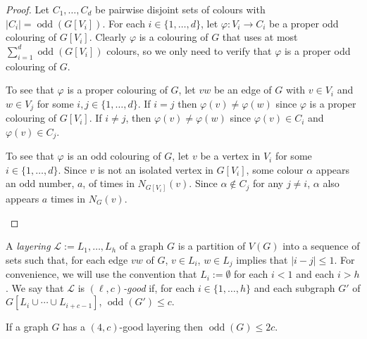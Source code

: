 \documentclass{patmorin}
\DeclareMathOperator{\odd}{odd}
\begin{document}
\begin{proof}
  Let $C_1,\ldots,C_d$ be pairwise disjoint sets of colours with $|C_i|=\odd(G[V_i])$.  For each $i\in\{1,\ldots,d\}$, let $\varphi:V_i\to C_i$ be a proper odd colouring of $G[V_i]$.  Clearly $\varphi$ is a colouring of $G$ that uses at most $\sum_{i=1}^d \odd(G[V_i])$ colours, so we only need to verify that $\varphi$ is a proper odd colouring of $G$.
  \begin{compactitem}
    \item To see that $\varphi$ is a proper colouring of $G$, let $vw$ be an edge of $G$ with $v\in V_i$ and $w\in V_j$ for some $i,j\in\{1,\ldots,d\}$. If $i=j$ then $\varphi(v)\neq\varphi(w)$ since $\varphi$ is a proper colouring of $G[V_i]$.  If $i\neq j$, then $\varphi(v)\neq\varphi(w)$ since $\varphi(v)\in C_i$ and $\varphi(v)\in C_j$.

    \item To see that $\varphi$ is an odd colouring of $G$, let $v$ be a vertex in $V_i$ for some $i\in\{1,\ldots,d\}$.   Since $v$ is not an isolated vertex in $G[V_i]$, some colour $\alpha$ appears an odd number, $a$, of times in $N_{G[V_i]}(v)$.  Since $\alpha\not\in C_j$ for any $j\neq i$, $\alpha$ also appears $a$ times in $N_G(v)$. \qedhere
  \end{compactitem}
\end{proof}


A \emph{layering} $\mathcal{L}:=L_1,\ldots,L_h$ of a graph $G$ is a partition of $V(G)$ into a sequence of sets such that, for each edge $vw$ of $G$, $v\in L_i$, $w\in L_j$ implies that $|i-j|\le 1$.  For convenience, we will use the convention that $L_i:=\emptyset$ for each $i < 1$ and each $i> h$.  We say that $\mathcal{L}$ is \emph{$(\ell,c)$-good} if, for each $i\in\{1,\ldots,h\}$ and each subgraph $G'$ of $G[L_i\cup\cdots\cup L_{i+c-1}]$, $\odd(G')\le c$.

\begin{lem}\label{partition}
  If a graph $G$ has a $(4,c)$-good layering then $\odd(G)\le 2c$.
\end{lem}
\end{document}
